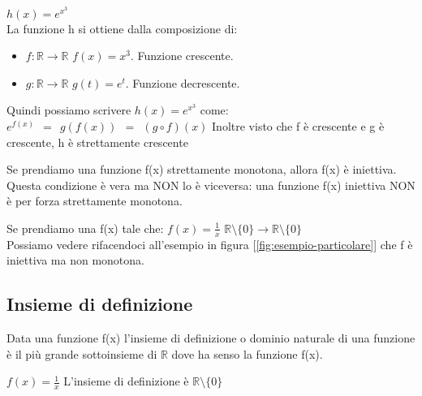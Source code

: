 \begin{example}
    $h(x) = e^{x^3}$\\
    La funzione h si ottiene dalla composizione di:
    \begin{itemize}
        \item $f: \mathbb{R} \longrightarrow \mathbb{R}$ \hspace{.3cm} $f(x) = x^3$. Funzione crescente.
        \item $g: \mathbb{R} \longrightarrow \mathbb{R}$ \hspace{.3cm} $g(t) = e^t$. Funzione decrescente.
    \end{itemize}
    Quindi possiamo scrivere $h(x) = e^{x^3}$ come: \hspace{.3cm} $e^{f(x)} \: \: = \: \: g(f(x)) \: \: = \: \: (g \circ f)(x)$
    Inoltre visto che f è crescente e g è crescente, h è strettamente crescente 
\end{example}
\begin{observation}
    Se prendiamo una funzione f(x) strettamente monotona, allora f(x) è iniettiva. Questa condizione è vera ma NON lo è viceversa: una funzione f(x) iniettiva NON è per forza strettamente monotona. 
\end{observation}
\begin{example}
    Se prendiamo una f(x) tale che: \hspace{.3cm} $f(x) = \frac{1}{x}$ \hspace{.3cm} $\mathbb{R} \setminus \{0\} \longrightarrow \mathbb{R} \setminus \{0\}$
    \\Possiamo vedere rifacendoci all'esempio in figura [\ref{fig:esempio-particolare}] che f è iniettiva ma non monotona.
\end{example}

\subsection{Insieme di definizione}
\begin{definition}
    Data una funzione f(x) l'insieme di definizione o dominio naturale di una funzione è il più grande sottoinsieme di $\mathbb{R}$ dove ha senso la funzione f(x).
\end{definition}
\begin{example}
    $f(x) = \frac{1}{x}$ \hspace{.3cm} L'insieme di definizione è $\mathbb{R} \setminus \{0\}$
\end{example}

